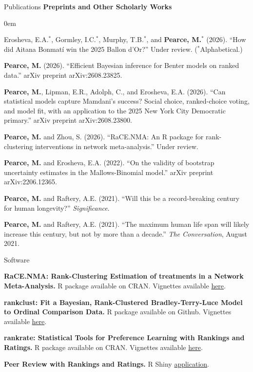 \documentclass{resume} %
\begin{document}
\begin{rSection}{Publications}
\noindent \textbf{Preprints and Other Scholarly Works}
\begin{etaremune}
\itemsep0em
\item Erosheva, E.A.$^*$, Gormley, I.C.$^*$, Murphy, T.B.$^*$, and \textbf{Pearce, M.}$^*$ (2026). ``How did Aitana Bonmatí win the 2025 Ballon d'Or?'' Under review. ($^*$Alphabetical.)
\item \textbf{Pearce, M.} (2026). ``Efficient Bayesian inference for Benter models on ranked data.'' arXiv preprint arXiv:2608.23825.
\item \textbf{Pearce, M.}, Lipman, E.R., Adolph, C., and Erosheva, E.A. (2026). ``Can statistical models capture Mamdani's success? Social choice, ranked-choice voting, and model fit, with an application to the 2025 New York City Democratic primary.'' arXiv preprint arXiv:2608.23800.
\item \textbf{Pearce, M.} and Zhou, S. (2026). ``RaCE.NMA: An R package for rank-clustering interventions in network meta-analysis.'' Under review. 
\item \textbf{Pearce, M.} and Erosheva, E.A. (2022). ``On the validity of bootstrap uncertainty estimates in the Mallows-Binomial model.'' arXiv preprint arXiv:2206.12365.
\item \textbf{Pearce, M.} and Raftery, A.E. (2021). ``Will this be a record-breaking century for human longevity?'' \textit{Significance}.
\item \textbf{Pearce, M.} and Raftery, A.E. (2021). ``The maximum human life span will likely increase this century, but not by more than a decade.'' \textit{The Conversation}, August 2021.
\end{etaremune}

\end{rSection}

\begin{rSection}{Software}

\textbf{RaCE.NMA: Rank-Clustering Estimation of treatments in a Network Meta-Analysis.} R package available on CRAN. Vignettes available \href{https://pearce790.github.io/RaCE.NMA/}{here}.

\textbf{rankclust: Fit a Bayesian, Rank-Clustered Bradley-Terry-Luce Model to Ordinal Comparison Data.} R package available on Github. Vignettes available \href{https://pearce790.github.io/rankclust/}{here}.

\textbf{rankrate: Statistical Tools for Preference Learning with Rankings and Ratings.} R package available on CRAN. Vignettes available \href{https://pearce790.github.io/rankrate/}{here}.

\textbf{Peer Review with Rankings and Ratings.} R Shiny \href{https://pearce790.shinyapps.io/rankrate_PeerReview/}{application}.

\end{rSection}
\end{document}
